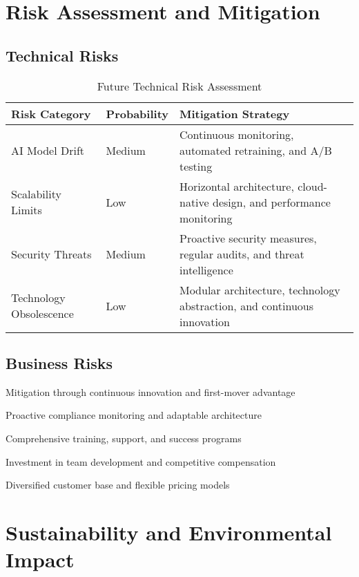 \section{Risk Assessment and Mitigation}

\subsection{Technical Risks}

\begin{table}[H]
\centering
\caption{Future Technical Risk Assessment}
\begin{tabular}{|p{3cm}|p{3cm}|p{6cm}|}
\hline
\textbf{Risk Category} & \textbf{Probability} & \textbf{Mitigation Strategy} \\
\hline
AI Model Drift & Medium & Continuous monitoring, automated retraining, and A/B testing \\
\hline
Scalability Limits & Low & Horizontal architecture, cloud-native design, and performance monitoring \\
\hline
Security Threats & Medium & Proactive security measures, regular audits, and threat intelligence \\
\hline
Technology Obsolescence & Low & Modular architecture, technology abstraction, and continuous innovation \\
\hline
\end{tabular}
\end{table}

\subsection{Business Risks}

\begin{description}[leftmargin=*]
    \item[Market Competition] Mitigation through continuous innovation and first-mover advantage
    \item[Regulatory Changes] Proactive compliance monitoring and adaptable architecture
    \item[Customer Adoption] Comprehensive training, support, and success programs
    \item[Talent Acquisition] Investment in team development and competitive compensation
    \item[Economic Factors] Diversified customer base and flexible pricing models
\end{description}

\section{Sustainability and Environmental Impact}

